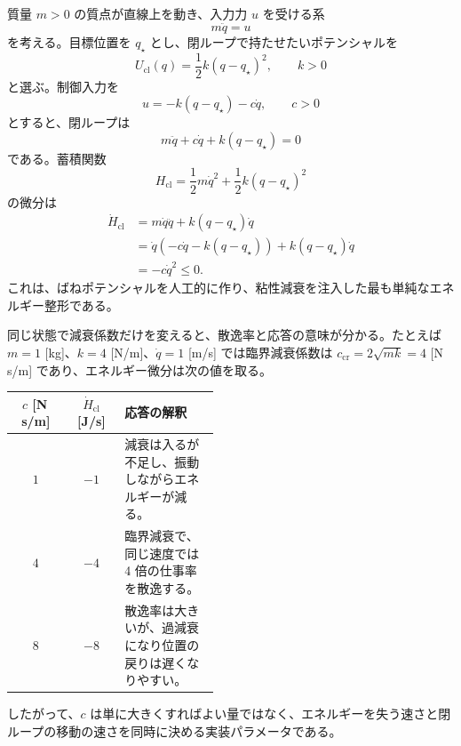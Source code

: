 \begin{example}[質点の位置決めにおけるエネルギー整形]
質量 $m>0$ の質点が直線上を動き、入力力 $u$ を受ける系
\begin{equation}
  m\ddot{q}=u
\end{equation}
を考える。目標位置を $q_\star$ とし、閉ループで持たせたいポテンシャルを
\begin{equation}
  U_\mathrm{cl}(q)=\frac{1}{2}k(q-q_\star)^2,\qquad k>0
\end{equation}
と選ぶ。制御入力を
\begin{equation}
  u=-k(q-q_\star)-c\dot{q},\qquad c>0
\end{equation}
とすると、閉ループは
\begin{equation}
  m\ddot{q}+c\dot{q}+k(q-q_\star)=0
\end{equation}
である。蓄積関数
\begin{equation}
  H_\mathrm{cl}
  =
  \frac{1}{2}m\dot{q}^2+\frac{1}{2}k(q-q_\star)^2
\end{equation}
の微分は
\begin{align}
  \dot{H}_\mathrm{cl}
  &=m\dot{q}\ddot{q}+k(q-q_\star)\dot{q}\\
  &=\dot{q}(-c\dot{q}-k(q-q_\star))
    +k(q-q_\star)\dot{q}\\
  &=-c\dot{q}^2\le0.
\end{align}
これは、ばねポテンシャルを人工的に作り、粘性減衰を注入した最も単純なエネルギー整形である。

同じ状態で減衰係数だけを変えると、散逸率と応答の意味が分かる。たとえば $m=1$ [kg]、$k=4$ [N/m]、$\dot{q}=1$ [m/s] では臨界減衰係数は $c_\mathrm{cr}=2\sqrt{mk}=4$ [N\,s/m] であり、エネルギー微分は次の値を取る。
\begin{center}
\begin{tabular}{c|c|p{0.46\linewidth}}
$c$ [N\,s/m] & $\dot{H}_\mathrm{cl}$ [J/s] & 応答の解釈\\ \hline
$1$ & $-1$ & 減衰は入るが不足し、振動しながらエネルギーが減る。\\
$4$ & $-4$ & 臨界減衰で、同じ速度では 4 倍の仕事率を散逸する。\\
$8$ & $-8$ & 散逸率は大きいが、過減衰になり位置の戻りは遅くなりやすい。\\
\end{tabular}
\end{center}
したがって、$c$ は単に大きくすればよい量ではなく、エネルギーを失う速さと閉ループの移動の速さを同時に決める実装パラメータである。
\end{example}

